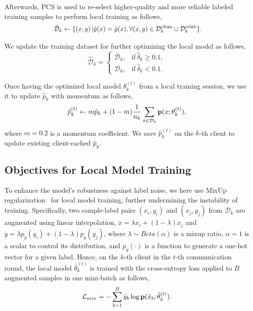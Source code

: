 \documentclass[letterpaper]{article} %
\begin{document}
Afterwards, PCS is used to re-select higher-quality and more reliable labeled training samples to perform local training as follows, 
\begin{equation}
    \label{Equation:Reselect}
    \fontsize{9.55pt}{12pt}\selectfont
    \begin{split}
        ~\bar{\mathcal{D}}_{k} \leftarrow \{\left(x, y\right) | \hat{y}(x)=\tilde{y}(x), \forall (x, y)\in \mathcal{D}_{k}^{\text{clean}} \cup \mathcal{D}_{k}^{\text{relab}}\}.
    \end{split}
\end{equation}

We update the training dataset for further optimizing the local model as follows,
\begin{equation}
    \label{Equation:Data-Split}
    \hat{\mathcal{D}}_{k} =
        \begin{cases} 
            \bar{\mathcal{D}}_{k}, &  \text{if}~\hat{\delta}_{k} \ge 0.1, \\
            \mathcal{D}_{k},  & \text{if}~\hat{\delta}_{k} < 0.1.
        \end{cases}
\end{equation}

Once having the optimized local model $\theta^{(t)}_k$ from a local training session, we use it to update $\hat{p}_{k}$ with momentum as follows,
\begin{equation}
    \label{Equation:Momentum-p}
    \hat{p}^{(t)}_{k} \leftarrow m\hat{p}_{k} +  (1-m)\frac{1}{n_{k}}\sum_{x\in \mathcal{D}_{k}} \textbf{\text{p}}(x;{\theta}^{(t)}_{k}),
\end{equation}
where $m=0.2$ is a momentum coefficient. We save $\hat{p}^{(t)}_{k}$ on the $k$-th client to update existing client-cached $\hat{p}_{k}$.

\subsection{Objectives for Local Model Training}

To enhance the model's robustness against label noise, we here use MixUp regularization~\cite{zhang2018mixup} for local model training, further undermining the instability of training. Specifically, two sample-label pairs $(x_i, y_i)$ and $(x_j, y_j)$ from $\hat{\mathcal{D}}_{k}$ are augmented using linear interpolation, ${\ddot{x}}={{\lambda}}{x_i}+({1-{\lambda}}){x_j}$ and ${\ddot{y}}={{\lambda}}{p_y(y_i)}+({1-{\lambda}}){p_y(y_j)}$, where ${\lambda}\sim Beta(\alpha)$ is a mixup ratio, $\alpha=1$ is a scalar to control its distribution, and $p_y(\cdot)$ is a function to generate a one-hot vector for a given label. Hence, on the $k$-th client in the $t$-th communication round, the local model $\hat{{\theta}}^{(t)}_k$ is trained with the cross-entropy loss applied to $B$ augmented samples in one mini-batch as follows,
\begin{equation}
    {\mathcal{L}}_{mix}=-\sum_{b=1}^{B}\ddot{y}_b\log{\textbf{\text{p}}(\ddot{x}_b;\hat{{\theta}}^{(t)}_k)}.
\end{equation}
\end{document}
